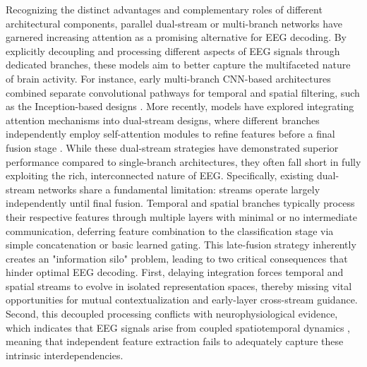 \documentclass[journal]{IEEEtran}
\theoremstyle{plain}
\begin{document}
Recognizing the distinct advantages and complementary roles of different architectural components, parallel dual-stream or multi-branch networks have garnered increasing attention as a promising alternative for EEG decoding. By explicitly decoupling and processing different aspects of EEG signals through dedicated branches, these models aim to better capture the multifaceted nature of brain activity. For instance, early multi-branch CNN-based architectures combined separate convolutional pathways for temporal and spatial filtering, such as the Inception-based designs \cite{wang2025dbconformer,salami2022eeg}. More recently, models have explored integrating attention mechanisms into dual-stream designs, where different branches independently employ self-attention modules to refine features before a final fusion stage \cite{gong2023astdf,amin2021attention}. While these dual-stream strategies have demonstrated superior performance compared to single-branch architectures, they often fall short in fully exploiting the rich, interconnected nature of EEG. Specifically, existing dual-stream networks share a fundamental limitation: streams operate largely independently until final fusion. Temporal and spatial branches typically process their respective features through multiple layers with minimal or no intermediate communication, deferring feature combination to the classification stage via simple concatenation or basic learned gating. This late-fusion strategy inherently creates an "information silo" problem, leading to two critical consequences that hinder optimal EEG decoding. First, delaying integration forces temporal and spatial streams to evolve in isolated representation spaces, thereby missing vital opportunities for mutual contextualization and early-layer cross-stream guidance. Second, this decoupled processing conflicts with neurophysiological evidence, which indicates that EEG signals arise from coupled spatiotemporal dynamics \cite{pfurtscheller2001motor,jiruska2013synchronization}, meaning that independent feature extraction fails to adequately capture these intrinsic interdependencies.
\end{document}
